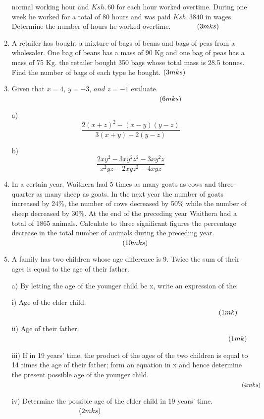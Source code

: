 \documentclass[
  letterpaper,
  DIV=11,
  numbers=noendperiod]{scrreprt}
\begin{document}
\begin{tcolorbox}
\begin{enumerate}
  normal working hour and \(Ksh.\, 60\) for each hour worked overtime.
  During one week he worked for a total of 80 hours and was paid
  \(Ksh. \,3840\) in wages. Determine the number of hours he worked
  overtime. \(\hspace{1.2cm}(3mks)\)
\item
  A retailer has bought a mixture of bags of beans and bags of peas from
  a wholesaler. One bag of beans has a mass of 90 Kg and one bag of peas
  has a mass of 75 Kg. the retailer bought 350 bags whose total mass is
  28.5 tonnes. Find the number of bags of each type he bought.
  \(\hspace{-0cm} (3mks)\)
\item
  Given that \(x=4,\, y= -3 ,\, and \,\,z= -1\) evaluate.
  \(\hspace{7.5cm} (6mks)\)

  a) \[ \frac{2(x+z)^2-(x-y)(y-z)}{3(x+y)-2(y-z)}\]

  b) \[
  \frac{2xy^2-3xy^2z^2-3xy^2z}{x^2yz-2xyz^2-4xyz}
  \]
\item
  In a certain year, Waithera had 5 times as many goats as cows and
  three-quarter as many sheep as goats. In the next year the number of
  goats increased by 24\%, the number of cows decreased by 50\% while
  the number of sheep decreased by 30\%. At the end of the preceding
  year Waithera had a total of 1865 animals. Calculate to three
  significant figures the percentage decrease in the total number of
  animals during the preceding year. \(\hspace{5.6cm} (10mks)\)
\item
  A family has two children whose age difference is 9. Twice the sum of
  their ages is equal to the age of their father.

  a) By letting the age of the younger child be x, write an expression
  of the:

  i) Age of the elder child. \(\hspace{10.5 cm} (1mk)\)

  ii) Age of their father. \(\hspace{11 cm} (1mk)\)

  iii) If in 19 years' time, the product of the ages of the two children
  is equal to 14 times the age of their father; form an equation in x
  and hence determine the present possible age of the younger child.
  \(\hspace{13.6 cm} (4mks)\)

  iv) Determine the possible age of the elder child in 19 years' time.
  \(\hspace{3.4 cm}(2mks)\)


\end{enumerate}
\end{tcolorbox}
\end{document}

